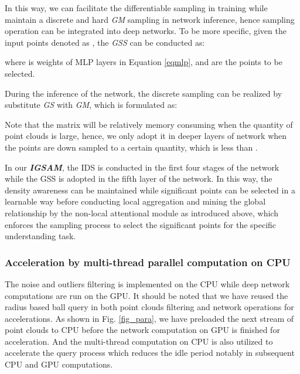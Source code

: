 \documentclass[journal]{IEEEtran}
\begin{document}
 In this way, we can facilitate the differentiable sampling in training while maintain a discrete and hard \textit{GM} sampling in network inference, hence sampling operation can be integrated into deep networks.  
To be more specific, given the input points denoted as , the \textit{GSS} can be conducted as:
  
 
 
 where  is weights of MLP layers in Equation \ref{eqmlp}, and  are the  points to be selected.

During the inference of the network, the discrete sampling can be realized by substitute \textit{GS} with \textit{GM}, which is formulated as:

 
Note that the matrix  will be relatively memory consuming when the quantity of point clouds is large, hence, we only adopt it in deeper layers of network when the points are down sampled to a certain quantity, which is less than .

In our \textit{\textbf{IGSAM}}, the IDS is conducted in the first four stages of the network while the GSS is adopted in the fifth layer of the network. In this way, the density awareness can be maintained while significant points can be selected in a learnable way before conducting local aggregation and mining the global relationship by the non-local attentional module as introduced above, which enforces the sampling process to select the significant points for the specific understanding task.
\subsubsection{Acceleration by multi-thread parallel computation on CPU}

The noise and outliers filtering is implemented on the CPU while deep network computations are run on the GPU. It should be noted that we have reused the radius based ball query in both point clouds filtering and network operations for accelerations. As shown in Fig. \ref{fig_para}, we have preloaded the next stream of point clouds to CPU before the network computation on GPU is finished for acceleration. And the multi-thread computation on CPU is also utilized to accelerate the query process which reduces the idle period notably in subsequent CPU and GPU computations. 
\end{document}
